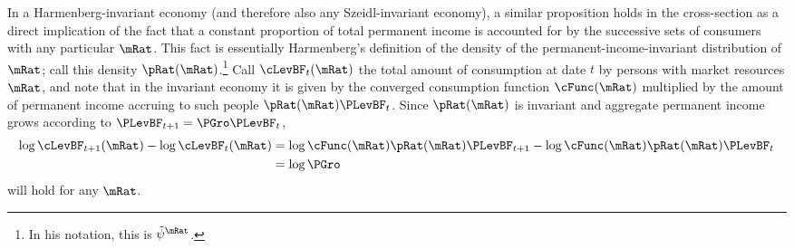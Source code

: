\documentclass[BufferStockTheory]{subfiles}
\begin{document}
In a Harmenberg-invariant economy (and therefore also any Szeidl-invariant economy), a similar proposition holds in the cross-section as a direct implication of the fact that a constant proportion of total permanent income is accounted for by the successive sets of consumers with any particular $\mRat$.  This fact is essentially Harmenberg's definition of the density of the permanent-income-invariant distribution of $\mRat$; call this density $\pRat(\mRat)$.\footnote{In his notation, this is $\tilde{\psi}^{\mRat}$.}  Call $\cLevBF_{t}(\mRat)$ the total amount of consumption at date $t$ by persons with market resources $\mRat$, and note that in the invariant economy it is given by the converged consumption function $\cFunc(\mRat)$ multiplied by the amount of permanent income accruing to such people $\pRat(\mRat)\PLevBF_{t}$.  Since $\pRat(\mRat)$ is invariant and aggregate permanent income grows according to $\PLevBF_{t+1} = \PGro \PLevBF_{t}$, 
\begin{equation*}
  \begin{split}
    \log \cLevBF_{t+1}(\mRat) - \log \cLevBF_{t}(\mRat) &  \notag 
    = \log \cFunc(\mRat) \pRat(\mRat)\PLevBF_{t+1} - \log \cFunc(\mRat)\pRat(\mRat)\PLevBF_{t} \\
    & = \log \PGro
  \end{split}
\end{equation*}
will hold for any $\mRat$.
\end{document}
